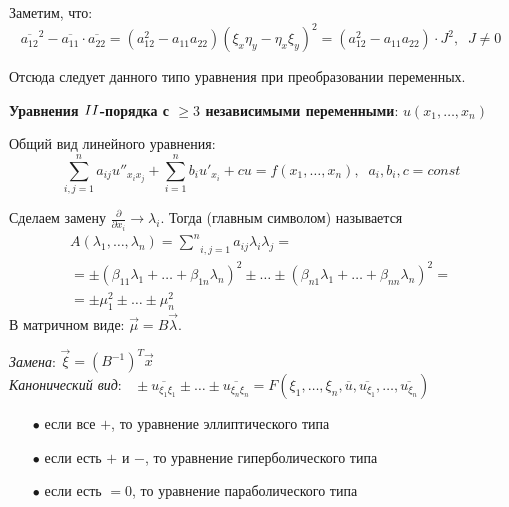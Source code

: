 Заметим, что:
$$\overline{a_{12}}^2 - \overline{a_{11}}\cdot \overline{a_{22}} = (a_{12}^2 - a_{11} a_{22})(\xi_x \eta_y - \eta_x \xi_y)^2 = (a_{12}^2 - a_{11} a_{22}) \cdot J^2, \;\; J \not = 0$$

Отсюда следует  данного типо уравнения при преобразовании переменных.

\vspace{0.5cm}
\textbf{Уравнения $\RNumb{2}$-порядка с $\ge 3$ независимыми переменными}: $u (x_1, \dots, x_n)$

\begin{definition}\label{cha:1/def:4}
	Общий вид линейного уравнения:
	$$\underset{i,j=1}{\overset{n}{\sum}}a_{i j} u''_{x_i x_j} + \underset{i=1}{\overset{n}{\sum}}b_i u'_{x_i} + c u = f (x_1, \dots, x_n), \;\; a_i, b_i, c = const$$
\end{definition}

\begin{definition}\label{cha:1/def:5}
	Сделаем замену $\frac{\partial}{\partial x_i} \to \lambda_i$. Тогда  (главным символом) называется 
	$$\begin{gathered}
		A(\lambda_1, \dots, \lambda_n) = \underset{i,j=1}{\overset{n}{\sum}}a_{i j} \lambda_i \lambda_j = \\
		= \pm (\beta_{1 1} \lambda_1 + \dots + \beta_{1 n} \lambda_n)^2 \pm \dots \pm (\beta_{n 1} \lambda_1 + \dots + \beta_{n n} \lambda_n)^2 = \\ = \pm \mu_1^2 \pm \dots \pm \mu_n^2
	\end{gathered}$$
	В матричном виде: $\overrightarrow{\mu} = B \overrightarrow{\lambda}$.
\end{definition}

\textit{Замена}: $\overrightarrow{\xi} = (B^{-1})^T \overrightarrow{x}$\\

\textit{Канонический вид}:
$\;\; \pm \overline{u_{\xi_1 \xi_1}} \pm \dots \pm \overline{u_{\xi_n \xi_n}} = F (\xi_1, \dots, \xi_n, \overline{u}, \overline{u_{\xi_1}}, \dots, \overline{u_{\xi_n}})$

\begin{itemize}
	\item[$\bullet$] если все $+$, то уравнение эллиптического типа
	\item[$\bullet$] если есть $+$ и $-$, то уравнение гиперболического типа
	\item[$\bullet$] если есть $= 0$, то уравнение параболического типа
\end{itemize}


